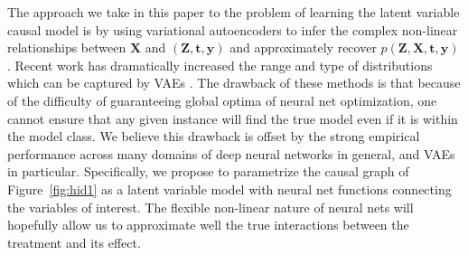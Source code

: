 \documentclass{article}
\def\*#1{\mathbf{#1}}
\begin{document}
The approach we take in this paper to the problem of learning the latent variable causal model is by using variational autoencoders \citep{kingma2013auto,rezende2014stochastic} to infer the complex non-linear relationships between $\*X$ and $(\*Z,\*t,\*y)$ and approximately recover $p\left(\*Z,\*X, \*t,\*y\right)$. Recent work has dramatically increased the range and type of distributions which can be captured by VAEs  \citep{tran2015variational,rezende2015variational,kingma2016improving}. The drawback of these methods is that because of the difficulty of guaranteeing global optima of neural net optimization, one cannot ensure that any given instance will find the true model even if it is within the model class. We believe this drawback is offset by the strong empirical performance across many domains of deep neural networks in general, and VAEs in particular. Specifically, we propose to parametrize the causal graph of Figure~\ref{fig:hid1} as a latent variable model with neural net functions connecting the variables of interest. The flexible non-linear nature of neural nets will hopefully allow us to approximate well the true interactions between the treatment and its effect.
\end{document}
